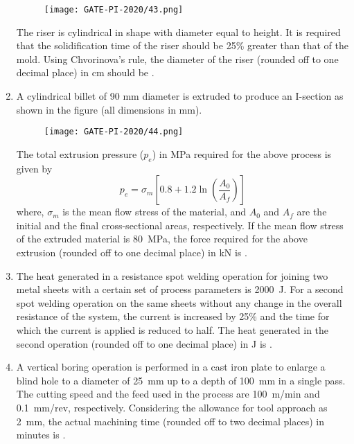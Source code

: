 \documentclass[journal,12pt,onecolumn]{IEEEtran}
\theoremstyle{remark}
\begin{document}
\begin{enumerate}
\begin{figure}[H]
    \centering
    \texttt{[image: GATE-PI-2020/43.png]}
    \caption{}
    \label{fig:moldriser}
\end{figure}

The riser is cylindrical in shape with diameter equal to height. It is required that the solidification time of the riser should be 25\% greater than that of the mold. Using Chvorinova's rule, the diameter of the riser (rounded off to one decimal place) in cm should be \underline{\hspace{2cm}}.
\vspace{1cm}
\newpage
\item A cylindrical billet of 90 mm diameter is extruded to produce an I-section as shown in the figure (all dimensions in mm).

\begin{figure}[H]
    \centering
    \texttt{[image: GATE-PI-2020/44.png]} 
    \caption{}
    \label{fig:extrudesection}
\end{figure}

The total extrusion pressure ($p_e$) in MPa required for the above process is given by
\[
p_e = \sigma_m \left[ 0.8 + 1.2 \ln\left( \frac{A_0}{A_f} \right) \right]
\]
where, $\sigma_m$ is the mean flow stress of the material, and $A_0$ and $A_f$ are the initial and the final cross-sectional areas, respectively. If the mean flow stress of the extruded material is 80~MPa, the force required for the above extrusion (rounded off to one decimal place) in kN is \underline{\hspace{2cm}}.
\vspace{1cm}

\item The heat generated in a resistance spot welding operation for joining two metal sheets with a certain set of process parameters is 2000~J. For a second spot welding operation on the same sheets without any change in the overall resistance of the system, the current is increased by 25\% and the time for which the current is applied is reduced to half. The heat generated in the second operation (rounded off to one decimal place) in J is \underline{\hspace{2cm}}.
\vspace{1cm}

\item A vertical boring operation is performed in a cast iron plate to enlarge a blind hole to a diameter of 25~mm up to a depth of 100~mm in a single pass. The cutting speed and the feed used in the process are 100~m/min and 0.1~mm/rev, respectively. Considering the allowance for tool approach as 2~mm, the actual machining time (rounded off to two decimal places) in minutes is \underline{\hspace{2cm}}.
\vspace{1cm}


\end{enumerate}
\end{document}
